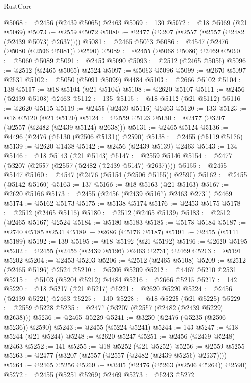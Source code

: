 \begin{lexlean}{RustCore}
\begin{coremodule}
@5068 := @2456 (@2439 @5065) @2463
@5069 := 130
@5072 := @18 @5069 (@21 @5069)
@5073 := @2559 @5072
@5080 := @2477 (@3207 (@2557 (@2557 (@2482 (@2439 @5073) @2637))))
@5081 := @2465 @5073
@5086 := @4547 (@2476 (@5080 (@2506 @5081)) @2590)
@5089 := @2455 (@5068 @5086) @2469
@5090 := @5060 @5089
@5091 := @2453 @5090
@5093 := @2512 (@2465 @5055)
@5096 := @2512 (@2465 @5065) @2524
@5097 := @5093 @5096
@5099 := @2670 @5097 @2531
@5102 := @5050 (@5091 @5099) @4484
@5103 := @2666 @5102
@5104 := 138
@5107 := @18 @5104 (@21 @5104)
@5108 := @2620 @5107
@5111 := @2456 (@2439 @5108) @2463
@5112 := 135
@5115 := @18 @5112 (@21 @5112)
@5116 := @2620 @5115
@5119 := @2456 (@2439 @5116) @2463
@5120 := 133
@5123 := @18 @5120 (@21 @5120)
@5124 := @2559 @5123
@5130 := @2477 (@3207 (@2557 (@2482 (@2439 @5124) @2638)))
@5131 := @2465 @5124
@5136 := @4496 (@2476 (@5130 (@2506 @5131)) @2590)
@5138 := @2455 (@5119 @5136)
@5139 := @2620 @1438
@5142 := @2456 (@2439 @5139) @2463
@5143 := 134
@5146 := @18 @5143 (@21 @5143)
@5147 := @2559 @5146
@5154 := @2477 (@3207 (@2557 (@2557 (@2482 (@2439 @5147) @2637))))
@5155 := @2465 @5147
@5160 := @4547 (@2476 (@5154 (@2506 @5155)) @2590)
@5162 := @2455 (@5142 @5160)
@5163 := 137
@5166 := @18 @5163 (@21 @5163)
@5167 := @2620 @5166
@5173 := @2455 (@2456 (@2439 @5167) @2463 @2731) @2469
@5174 := @5162 @5173
@5175 := @5138 @5174
@5176 := @2453 @5175
@5178 := @2512 (@2465 @5116)
@5180 := @2512 (@2465 @5139)
@5183 := @2512 (@2465 @5167) @2524
@5184 := @5180 @5183
@5185 := @5178 @5184
@5187 := @2740 @5185 @2531
@5189 := @2686 (@5176 @5187)
@5191 := @2455 (@5111 @5189)
@5192 := 139
@5195 := @18 @5192 (@21 @5192)
@5196 := @2620 @5195
@5202 := @2455 (@2456 (@2439 @5196) @2463 @2731) @2469
@5203 := @5191 @5202
@5204 := @2453 @5203
@5206 := @2512 (@2465 @5108)
@5209 := @2512 (@2465 @5196) @2524
@5210 := @5206 @5209
@5212 := @4467 @5210 @2531
@5215 := @5103 (@5204 @5212) @4484
@5216 := @2666 @5215
@5217 := 142
@5220 := @18 @5217 (@21 @5217)
@5221 := @2620 @5220
@5224 := @2456 (@2439 @5221) @2463
@5225 := 140
@5228 := @18 @5225 (@21 @5225)
@5229 := @2559 @5228
@5235 := @2477 (@3207 (@2557 (@2482 (@2439 @5229) @2638)))
@5236 := @2465 @5229
@5241 := @3250 (@2476 (@5235 (@2506 @5236)) @2590)
@5243 := @2455 (@5224 @5241)
@5244 := 143
@5247 := @18 @5244 (@21 @5244)
@5248 := @2620 @5247
@5251 := @2456 (@2439 @5248) @2463
@5252 := 141
@5255 := @18 @5252 (@21 @5252)
@5256 := @2559 @5255
@5263 := @2477 (@3207 (@2557 (@2557 (@2482 (@2439 @5256) @2637))))
@5264 := @2465 @5256
@5269 := @3205 (@2476 (@5263 (@2506 @5264)) @2590)
@5272 := @2455 (@5251 @5269) @2469
@5273 := @5243 @5272

\end{coremodule}
\end{lexlean}
